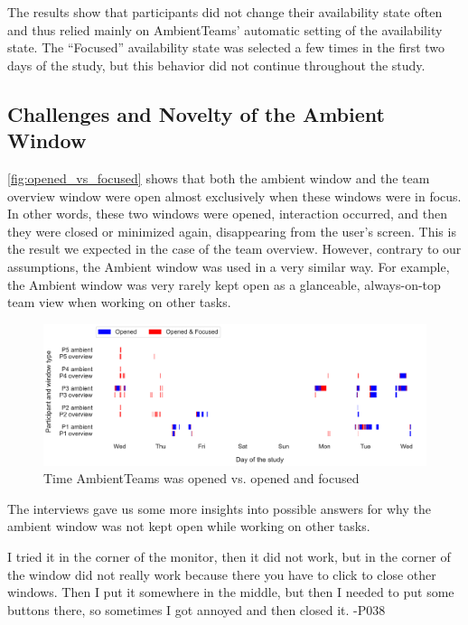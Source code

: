 The results show that participants did not change their availability state often and thus relied mainly on AmbientTeams' automatic setting of the availability state. The \enquote{Focused} availability state was selected a few times in the first two days of the study, but this behavior did not continue throughout the study.

\subsection{Challenges and Novelty of the Ambient Window}
\autoref{fig:opened_vs_focused} shows that both the ambient window and the team overview window were open almost exclusively when these windows were in focus. In other words, these two windows were opened, interaction occurred, and then they were closed or minimized again, disappearing from the user's screen. This is the result we expected in the case of the team overview. However, contrary to our assumptions, the Ambient window was used in a very similar way. For example, the Ambient window was very rarely kept open as a glanceable, always-on-top team view when working on other tasks.

\begin{figure}[h]
    \centering
    \includegraphics[width=\linewidth]{plots/open_vs_focus.pdf}
    \caption{Time AmbientTeams was opened vs. opened and focused}
    \label{fig:opened_vs_focused}
\end{figure}

The interviews gave us some more insights into possible answers for why the ambient window was not kept open while working on other tasks.

\begin{displayquote}
    I tried it in the corner of the monitor, then it did not work, but in the corner of the window did not really work because there you have to click to close other windows. Then I put it somewhere in the middle, but then I needed to put some buttons there, so sometimes I got annoyed and then closed it. -P038
\end{displayquote}

